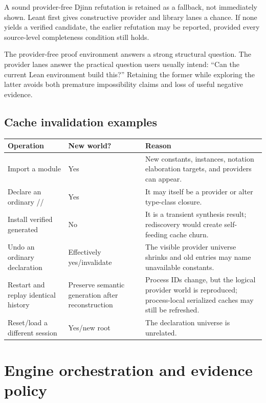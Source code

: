 \documentclass[10pt,letterpaper,oneside]{report}
\newcommand{\code}[1]{\texttt{\detokenize{#1}}}
\begin{document}
A sound provider-free Djinn refutation is retained as a fallback, not immediately shown. Leant first gives constructive provider and library lanes a chance. If none yields a verified candidate, the earlier refutation may be reported, provided every source-level completeness condition still holds.

\begin{designbox}
The provider-free proof environment answers a strong structural question. The provider lanes answer the practical question users usually intend: ``Can the current Lean environment build this?'' Retaining the former while exploring the latter avoids both premature impossibility claims and loss of useful negative evidence.
\end{designbox}

\section{Cache invalidation examples}

\begin{center}
\begin{tabularx}{0.95\textwidth}{@{}L{0.38\textwidth}L{0.18\textwidth}Y@{}}
\toprule
\textbf{Operation} & \textbf{New world?} & \textbf{Reason} \\
\midrule
Import a module & Yes & New constants, instances, notation elaboration targets, and providers can appear. \\
Declare an ordinary \code{def}/\code{theorem}/\code{instance} & Yes & It may itself be a provider or alter type-class closure. \\
Install verified generated \code{it} & No & It is a transient synthesis result; rediscovery would create self-feeding cache churn. \\
Undo an ordinary declaration & Effectively yes/invalidate & The visible provider universe shrinks and old entries may name unavailable constants. \\
Restart and replay identical history & Preserve semantic generation after reconstruction & Process IDs change, but the logical provider world is reproduced; process-local serialized caches may still be refreshed. \\
Reset/load a different session & Yes/new root & The declaration universe is unrelated. \\
\bottomrule
\end{tabularx}
\end{center}

\chapter{Engine orchestration and evidence policy}\label{ch:leant-synth-flow}
\end{document}
